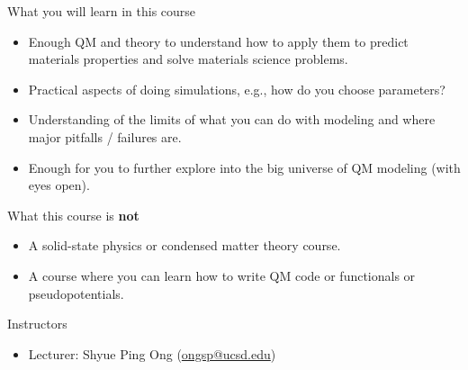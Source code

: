 \documentclass[aspectratio=169]{beamer}
\begin{document}
    \begin{frame}{What you will learn in this course}
        \begin{itemize}
            \item Enough QM and theory to understand how to apply them to predict materials properties and solve materials science problems.
            \item Practical aspects of doing simulations, e.g., how do you choose parameters?
            \item Understanding of the limits of what you can do with modeling and where major pitfalls / failures are.
            \item Enough for you to further explore into the big universe of QM modeling (with eyes open).
        \end{itemize}

    \end{frame}

    \begin{frame}{What this course is \textbf{not}}
        \begin{itemize}
            \item A solid-state physics or condensed matter theory course.
            \item A course where you can learn how to write QM code or functionals or pseudopotentials.
        \end{itemize}
    \end{frame}


    \begin{frame}{Instructors}
        \begin{itemize}
            \item Lecturer: Shyue Ping Ong (\href{mailto:ongsp@ucsd.edu}{ongsp@ucsd.edu})
        \end{itemize}
    \end{frame}
\end{document}
